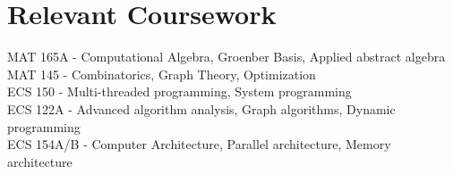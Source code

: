 \section{\sc Relevant Coursework}
MAT 165A - Computational Algebra, Groenber Basis, Applied abstract algebra\\
MAT 145 - Combinatorics, Graph Theory, Optimization\\
ECS 150 - Multi-threaded programming, System programming\\
ECS 122A - Advanced algorithm analysis, Graph algorithms, Dynamic programming\\
ECS 154A/B - Computer Architecture, Parallel architecture, Memory architecture

\endinput